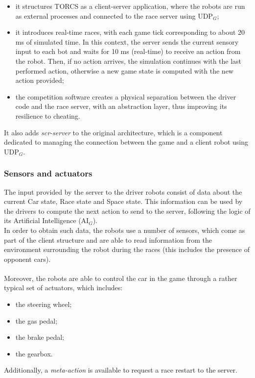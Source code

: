 \begin{itemize}
	\item it structures TORCS as a client-server application, where the robots are run as external processes and connected to the race server using UDP$_G$;
	\item it introduces real-time races, with each game tick corresponding to about 20 ms of simulated time. In this context, the server sends the current sensory input to each bot and waits for 10 ms (real-time) to receive an action from the robot. Then, if no action arrives, the simulation continues with the last performed action, otherwise a new game state is computed with the new action provided;
	\item the competition software creates a physical separation between the driver code and the race server, with an abstraction layer, thus improving its resilience to cheating.
\end{itemize}
It also adds \textit{scr-server} to the original architecture, which is a component dedicated to managing the connection between the game and a client robot using UDP$_G$.
\subsubsection{Sensors and actuators}\label{sensors-actuators}
The input provided by the server to the driver robots consist of data about the current Car state, Race state and Space state. This information can be used by the drivers to compute the next action to send to the server, following the logic of its Artificial Intelligence (AI$_G$). \\
In order to obtain such data, the robots use a number of sensors, which come as part of the client structure and are able to read information from the environment surrounding the robot during the races (this includes the presence of opponent cars). \\ \\
Moreover, the robots are able to control the car in the game through a rather typical set of actuators, which includes:
\begin{itemize}
	\item the steering wheel;
	\item the gas pedal;
	\item the brake pedal;
	\item the gearbox.
\end{itemize}
Additionally, a \textit{meta-action} is available to request a race restart to the server.